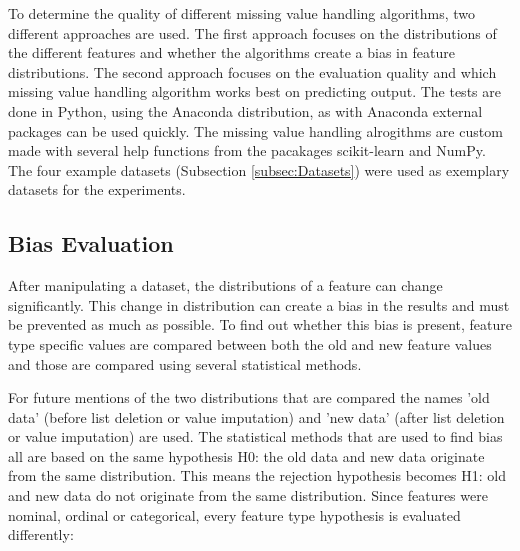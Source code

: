 \documentclass[10pt,a4paper]{article}
\begin{document}
	To determine the quality of different missing value handling algorithms, two different approaches are used. The first approach focuses on the distributions of the different features and whether the algorithms create a bias in feature distributions. The second approach focuses on the evaluation quality and which missing value handling algorithm works best on predicting output. The tests are done in Python, using the Anaconda distribution, as with Anaconda external packages can be used quickly. The missing value handling alrogithms are custom made with several help functions from the pacakages scikit-learn\cite{pedregosa2011scikit} and NumPy\cite{walt2011numpy}. The four example datasets (Subsection \ref{subsec:Datasets}) were used as exemplary datasets for the experiments.
	
	
	\subsection{Bias Evaluation}
	\label{subsec:BiasEvaluation}

	After manipulating a dataset, the distributions of a feature can change significantly. This change in distribution can create a bias in the results and must be prevented as much as possible. To find out whether this bias is present, feature type specific values are compared between both the old and new feature values and those are compared using several statistical methods.
	
	For future mentions of the two distributions that are compared the names 'old data' (before list deletion or value imputation) and 'new data' (after list deletion or value imputation) are used. The statistical methods that are used to find bias all are based on the same hypothesis H0: the old data and new data originate from the same distribution. This means the rejection hypothesis becomes H1: old and new data do not originate from the same distribution. Since features were nominal, ordinal or categorical, every feature type hypothesis is evaluated differently:
	
\end{document}

